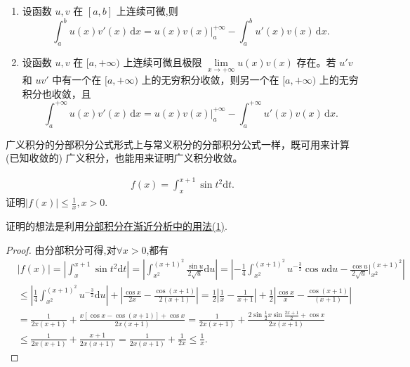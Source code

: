 \documentclass[../../main.tex]{subfiles}%
\begin{document}
\begin{theorem}[分部积分公式]\label{theorem:分部积分公式}
\begin{enumerate}
\item 设函数 \( u, v \) 在 \([a, b]\) 上连续可微,则
\[
\int_a^b{u\left( x \right) v' \left( x \right) \,\mathrm{d}x}=u\left( x \right) v\left( x \right) \Big|_{a}^{+\infty}-\int_a^b{u'\left( x \right) v\left( x \right) \,\mathrm{d}x}.
\]

\item 设函数 \( u, v \) 在 \([a, +\infty)\) 上连续可微且极限 \( \lim\limits_{x \to +\infty} u(x)v(x) \) 存在。若 \( u'v \) 和 \( uv' \) 中有一个在 \([a, +\infty)\) 上的无穷积分收敛，则另一个在 \([a, +\infty)\) 上的无穷积分也收敛，且
\[
\int_a^{+\infty} u(x)v'(x) \, \mathrm{d}x = u(x)v(x) \Big |_a^{+\infty} - \int_a^{+\infty} u'(x)v(x) \, \mathrm{d}x.
\]
\end{enumerate}
\end{theorem}
\begin{remark}
广义积分的分部积分公式形式上与常义积分的分部积分公式一样，既可用来计算 (已知收敛的) 广义积分，也能用来证明广义积分收敛。
\end{remark}

\begin{example}
\begin{align*}
f\left( x \right) =\int_x^{x+1}{\sin t^2 \mathrm{d}t}.
\end{align*}
证明$\left| f\left( x \right) \right|\leqslant \frac{1}{x},x>0$.
\end{example}
\begin{note}
证明的想法是利用\hyperref[分部积分在渐近分析中的用法(1)]{分部积分在渐近分析中的用法(1)}.
\end{note}
\begin{proof}
由分部积分可得,对$\forall x>0$,都有
\begin{align*}
&\left| f\left( x \right) \right|=\left| \int_x^{x+1}{\sin t^2  \mathrm{d}t} \right|=\left| \int_{x^2}^{\left( x+1 \right) ^2}{\frac{\sin u}{2\sqrt{u}}\mathrm{d}u} \right|=\left| -\frac{1}{4}\int_{x^2}^{\left( x+1 \right) ^2}{u^{-\frac{3}{2}}\cos u\mathrm{d}u}-\frac{\cos u}{2\sqrt{u}}\Big|_{x^2}^{\left( x+1 \right) ^2} \right|
\\
&\leqslant \left| \frac{1}{4}\int_{x^2}^{\left( x+1 \right) ^2}{u^{-\frac{3}{2}}\mathrm{d}u} \right|+\left| \frac{\cos x}{2x}-\frac{\cos \left( x+1 \right)}{2\left( x+1 \right)} \right|=\frac{1}{2}\left| \frac{1}{x}-\frac{1}{x+1} \right|+\frac{1}{2}\left| \frac{\cos x}{x}-\frac{\cos \left( x+1 \right)}{\left( x+1 \right)} \right|
\\
&=\frac{1}{2x\left( x+1 \right)}+\frac{x\left[ \cos x-\cos \left( x+1 \right) \right] +\cos x}{2x\left( x+1 \right)}=\frac{1}{2x\left( x+1 \right)}+\frac{2\sin \frac{1}{2}x\sin \frac{2x+1}{2}+\cos x}{2x\left( x+1 \right)}
\\
&\leqslant \frac{1}{2x\left( x+1 \right)}+\frac{x+1}{2x\left( x+1 \right)}=\frac{1}{2x\left( x+1 \right)}+\frac{1}{2x}\leqslant \frac{1}{x}.
\end{align*}
\end{proof}
\end{document}

